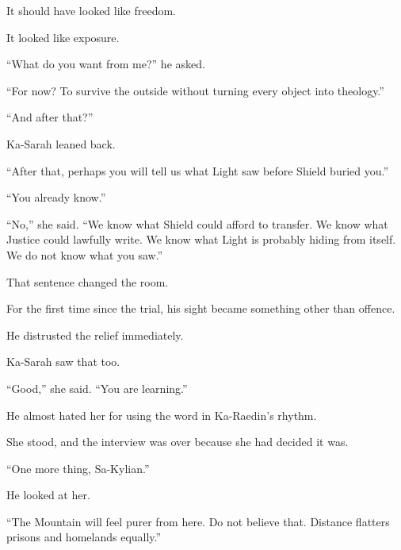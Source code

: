 It should have looked like freedom.\par

It looked like exposure.\par

“What do you want from me?” he asked.\par

“For now? To survive the outside without turning every object into theology.”\par

“And after that?”\par

Ka-Sarah leaned back.\par

“After that, perhaps you will tell us what Light saw before Shield buried you.”\par

“You already know.”\par

“No,” she said. “We know what Shield could afford to transfer. We know what Justice could lawfully write. We know what Light is probably hiding from itself. We do not know what you saw.”\par

That sentence changed the room.\par

For the first time since the trial, his sight became something other than offence.\par

He distrusted the relief immediately.\par

Ka-Sarah saw that too.\par

“Good,” she said. “You are learning.”\par

He almost hated her for using the word in Ka-Raedin’s rhythm.\par

She stood, and the interview was over because she had decided it was.\par

“One more thing, Sa-Kylian.”\par

He looked at her.\par

“The Mountain will feel purer from here. Do not believe that. Distance flatters prisons and homelands equally.”\par

